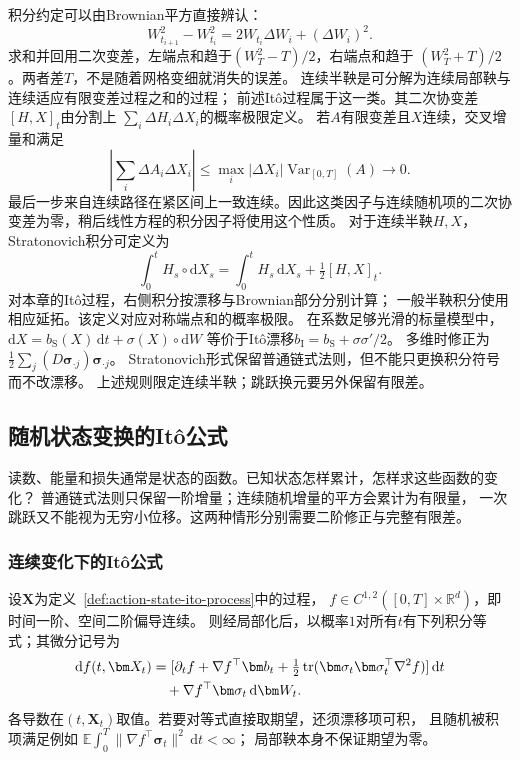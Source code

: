 积分约定可以由Brownian平方直接辨认：
\[
 W_{t_{i+1}}^2-W_{t_i}^2
     =2W_{t_i}\Delta W_i+(\Delta W_i)^2.
\]
求和并回用二次变差，左端点和趋于$(W_T^2-T)/2$，右端点和趋于
$(W_T^2+T)/2$。两者差$T$，不是随着网格变细就消失的误差。
连续半鞅是可分解为连续局部鞅与连续适应有限变差过程之和的过程；
前述Itô过程属于这一类。其二次协变差$[H,X]_t$由分割上
$\sum_i\Delta H_i\Delta X_i$的概率极限定义。
若$A$有限变差且$X$连续，交叉增量和满足
\[
 \left|\sum_i\Delta A_i\Delta X_i\right|
 \leq\max_i|\Delta X_i|\operatorname{Var}_{[0,T]}(A)
 \longrightarrow0.
\]
最后一步来自连续路径在紧区间上一致连续。因此这类因子与连续随机项的二次协变差为零，稍后线性方程的积分因子将使用这个性质。
对于连续半鞅$H,X$，
Stratonovich积分可定义为
\[
  \int_0^t H_s\circ\mathrm dX_s
       =\int_0^t H_s\,\mathrm dX_s+\tfrac12[H,X]_t.
\]
对本章的Itô过程，右侧积分按漂移与Brownian部分分别计算；
一般半鞅积分使用相应延拓。该定义对应对称端点和的概率极限。
在系数足够光滑的标量模型中，
$\mathrm dX=b_{\mathrm S}(X)\,\mathrm dt+\sigma(X)\circ\mathrm dW$
等价于Itô漂移$b_{\mathrm I}=b_{\mathrm S}+\sigma\sigma'/2$。
多维时修正为$\frac12\sum_j(D\bm\sigma_{\cdot j})\bm\sigma_{\cdot j}$。
Stratonovich形式保留普通链式法则，但不能只更换积分符号而不改漂移。
上述规则限定连续半鞅；跳跃换元要另外保留有限差。

\subsection{随机状态变换的Itô公式}

读数、能量和损失通常是状态的函数。已知状态怎样累计，怎样求这些函数的变化？
普通链式法则只保留一阶增量；连续随机增量的平方会累计为有限量，
一次跳跃又不能视为无穷小位移。这两种情形分别需要二阶修正与完整有限差。

\subsubsection{连续变化下的Itô公式}

\begin{theorem}[Itô公式]
  \label{thm:dynamical-ito-formula}
  设$\bm X$为定义~\ref{def:action-state-ito-process}中的过程，
  $f\in C^{1,2}([0,T]\times\mathbb R^d)$，即时间一阶、空间二阶偏导连续。
  则经局部化后，以概率$1$对所有$t$有下列积分等式；其微分记号为
  \begin{align}
    \mathrm df(t,\bm X_t)
      &=[\partial_t f+\nabla f^\top\bm b_t
         +\tfrac12\operatorname{tr}
               (\bm\sigma_t\bm\sigma_t^\top\nabla^2 f)]\,\mathrm dt\notag\\
      &\quad+\nabla f^\top\bm\sigma_t\,\mathrm d\bm W_t.
    \label{eq:dynamical-ito-formula}
  \end{align}
  各导数在$(t,\bm X_t)$取值。若要对等式直接取期望，还须漂移项可积，
  且随机被积项满足例如
  $\mathbb E\int_0^T\|\nabla f^\top\bm\sigma_t\|^2\,\mathrm dt<\infty$；
  局部鞅本身不保证期望为零。
\end{theorem}

